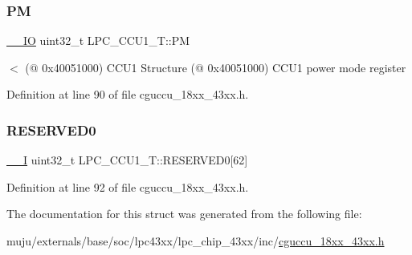 \subsubsection{\texorpdfstring{PM}{PM}}
{\footnotesize\ttfamily \hyperlink{core__sc300_8h_aec43007d9998a0a0e01faede4133d6be}{\+\_\+\+\_\+\+IO} uint32\+\_\+t L\+P\+C\+\_\+\+C\+C\+U1\+\_\+\+T\+::\+PM}

$<$ (@ 0x40051000) C\+C\+U1 Structure (@ 0x40051000) C\+C\+U1 power mode register 

Definition at line 90 of file cguccu\+\_\+18xx\+\_\+43xx.\+h.

\mbox{\label{struct_l_p_c___c_c_u1___t_abd261ac583b5b596db43e2b8854c2967}} 
\subsubsection{\texorpdfstring{R\+E\+S\+E\+R\+V\+E\+D0}{RESERVED0}}
{\footnotesize\ttfamily \hyperlink{core__sc300_8h_af63697ed9952cc71e1225efe205f6cd3}{\+\_\+\+\_\+I} uint32\+\_\+t L\+P\+C\+\_\+\+C\+C\+U1\+\_\+\+T\+::\+R\+E\+S\+E\+R\+V\+E\+D0\mbox{[}62\mbox{]}}



Definition at line 92 of file cguccu\+\_\+18xx\+\_\+43xx.\+h.



The documentation for this struct was generated from the following file\+:\begin{DoxyCompactItemize}
\item 
muju/externals/base/soc/lpc43xx/lpc\+\_\+chip\+\_\+43xx/inc/\hyperlink{cguccu__18xx__43xx_8h}{cguccu\+\_\+18xx\+\_\+43xx.\+h}\end{DoxyCompactItemize}
